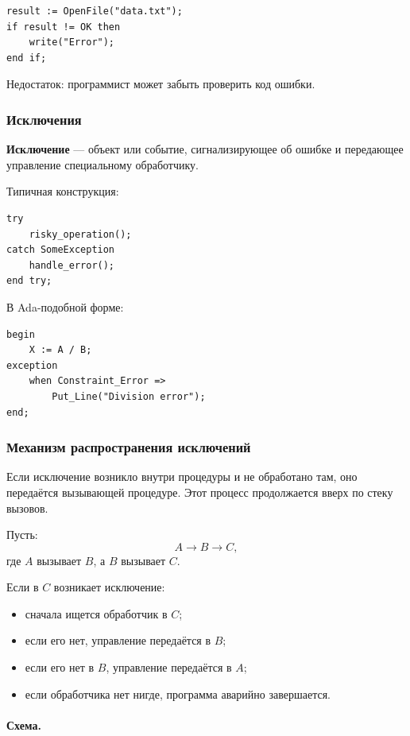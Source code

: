 \documentclass[12pt,a4paper]{article}
\begin{document}
\begin{verbatim}
result := OpenFile("data.txt");
if result != OK then
    write("Error");
end if;
\end{verbatim}

Недостаток: программист может забыть проверить код ошибки.

\subsubsection{Исключения}

\textbf{Исключение} --- объект или событие, сигнализирующее об ошибке и передающее управление специальному обработчику.

Типичная конструкция:

\begin{verbatim}
try
    risky_operation();
catch SomeException
    handle_error();
end try;
\end{verbatim}

В Ada-подобной форме:

\begin{verbatim}
begin
    X := A / B;
exception
    when Constraint_Error =>
        Put_Line("Division error");
end;
\end{verbatim}

\subsubsection{Механизм распространения исключений}

Если исключение возникло внутри процедуры и не обработано там, оно передаётся вызывающей процедуре. Этот процесс продолжается вверх по стеку вызовов.

Пусть:
\[
    A \to B \to C,
\]
где $A$ вызывает $B$, а $B$ вызывает $C$.

Если в $C$ возникает исключение:
\begin{itemize}
    \item сначала ищется обработчик в $C$;
    \item если его нет, управление передаётся в $B$;
    \item если его нет в $B$, управление передаётся в $A$;
    \item если обработчика нет нигде, программа аварийно завершается.
\end{itemize}

\paragraph{Схема.}
\end{document}

